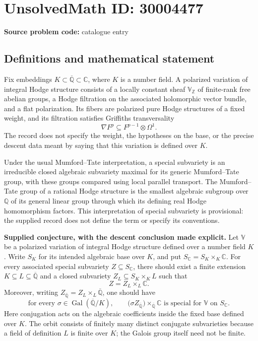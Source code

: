 \documentclass[11pt]{article}
\newcommand{\Z}{\mathbb{Z}}
\newcommand{\Q}{\mathbb{Q}}
\newcommand{\C}{\mathbb{C}}
\begin{document}
\section*{UnsolvedMath ID: 30004477}
\textbf{Source problem code:} catalogue entry
\subsection{Definitions and mathematical statement}
Fix embeddings \(K\subset\overline{\Q}\subset\C\), where \(K\) is a number field. A polarized variation of integral Hodge structure consists of a locally constant sheaf \(\mathbb V_{\Z}\) of finite-rank free abelian groups, a Hodge filtration on the associated holomorphic vector bundle, and a flat polarization. Its fibers are polarized pure Hodge structures of a fixed weight, and its filtration satisfies Griffiths transversality
\[
\nabla F^p\subseteq F^{p-1}\otimes\Omega^1.
\]
The record does not specify the weight, the hypotheses on the base, or the precise descent data meant by saying that this variation is defined over \(K\).

Under the usual Mumford--Tate interpretation, a special subvariety is an irreducible closed algebraic subvariety maximal for its generic Mumford--Tate group, with these groups compared using local parallel transport. The Mumford--Tate group of a rational Hodge structure is the smallest algebraic subgroup over \(\Q\) of its general linear group through which its defining real Hodge homomorphism factors. This interpretation of special subvariety is provisional: the supplied record does not define the term or specify its conventions.

\textbf{Supplied conjecture, with the descent conclusion made explicit.} Let \(\mathbb V\) be a polarized variation of integral Hodge structure defined over a number field \(K\). Write \(S_K\) for its intended algebraic base over \(K\), and put \(S_{\C}=S_K\times_K\C\). For every associated special subvariety \(Z\subseteq S_{\C}\), there should exist a finite extension \(K\subseteq L\subseteq\overline{\Q}\) and a closed subvariety \(Z_L\subseteq S_K\times_K L\) such that
\[
Z=Z_L\times_L\C.
\]
Moreover, writing \(Z_{\overline{\Q}}=Z_L\times_L\overline{\Q}\), one should have
\[
\text{for every }\sigma\in\operatorname{Gal}(\overline{\Q}/K),\qquad
\bigl(\sigma Z_{\overline{\Q}}\bigr)\times_{\overline{\Q}}\C
\text{ is special for }\mathbb V\text{ on }S_{\C}.
\]
Here conjugation acts on the algebraic coefficients inside the fixed base defined over \(K\). The orbit consists of finitely many distinct conjugate subvarieties because a field of definition \(L\) is finite over \(K\); the Galois group itself need not be finite.
\end{document}
